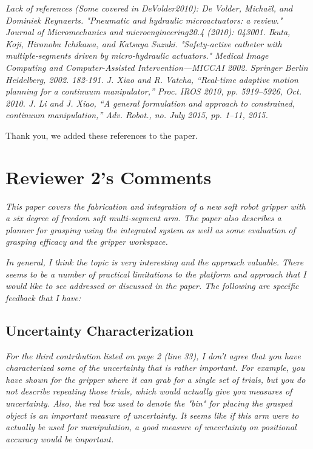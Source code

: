 \documentclass[letterpaper, 10 pt, twocolumn, conference]{article}
\begin{document}
\textit{Lack of references (Some covered in DeVolder2010):
De Volder, Michaël, and Dominiek Reynaerts. "Pneumatic and hydraulic microactuators: a review." Journal of Micromechanics and microengineering20.4 (2010): 043001.
Ikuta, Koji, Hironobu Ichikawa, and Katsuya Suzuki. "Safety-active catheter with multiple-segments driven by micro-hydraulic actuators." Medical Image Computing and Computer-Assisted Intervention—MICCAI 2002. Springer Berlin Heidelberg, 2002. 182-191.
J. Xiao and R. Vatcha, “Real-time adaptive motion planning for a continuum manipulator,” Proc. IROS 2010, pp. 5919–5926, Oct. 2010.
J. Li and J. Xiao, “A general formulation and approach to constrained, continuum manipulation,” Adv. Robot., no. July 2015, pp. 1–11, 2015.}

Thank you, we added these references to the paper.  


\section{Reviewer 2's Comments}

\textit{This paper covers the fabrication and integration of a new soft robot gripper with a six degree of freedom soft multi-segment arm. The paper also describes a planner for grasping using the integrated system as well as some evaluation of grasping efficacy and the gripper workspace.}

\textit{In general, I think the topic is very interesting and the approach valuable. There seems to be a number of practical limitations to the platform and approach that I would like to see addressed or discussed in the paper. The following are specific feedback that I have:}

\subsection{Uncertainty Characterization}
\textit{For the third contribution listed on page 2 (line 33), I don't agree that you have characterized some of the uncertainty that is rather important. For example, you have shown for the gripper where it can grab for a single set of trials, but you do not describe repeating those trials, which would actually give you measures of uncertainty. Also, the red box used to denote the "bin" for placing the grasped object is an important measure of uncertainty. It seems like if this arm were to actually be used for manipulation, a good measure of uncertainty on positional accuracy would be important.}
\end{document}
